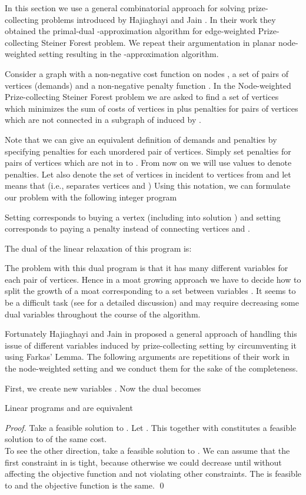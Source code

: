 In this section we use a general combinatorial approach for solving prize-collecting problems introduced by Hajiaghayi and Jain \cite{Hajiaghayi}. In their work they obtained the primal-dual -approximation algorithm for edge-weighted Prize-collecting Steiner Forest problem. We repeat their argumentation in planar node-weighted setting resulting in the -approximation algorithm. 

Consider a graph  with a non-negative cost function on nodes , a set of pairs of vertices (demands)  and a non-negative penalty function . In the Node-weighted Prize-collecting Steiner Forest problem we are asked to find a set of vertices  which minimizes the sum of costs of vertices in  plus penalties for pairs of vertices which are not connected in a subgraph of  induced by .

Note that we can give an equivalent definition of demands and penalties by specifying penalties for each unordered pair of vertices. Simply set penalties for pairs of vertices which are not in  to . From now on we will use values  to denote penalties. Let also  denote the set of vertices in  incident to vertices from  and let  means that  (i.e.,  separates vertices  and )
Using this notation, we can formulate our problem with the following integer program

Setting  corresponds to buying a vertex  (including  into solution ) and setting  corresponds to paying a penalty instead of connecting vertices  and .

The dual of the linear relaxation of this program is:

The problem with this dual program is that it has many different variables for each pair of vertices. Hence in a moat growing approach we have to decide how to split the growth of a moat corresponding to a set  between variables . It seems to be a difficult task (see \cite{Hajiaghayi} for a detailed discussion) and may require decreasing some dual variables throughout the course of the algorithm.

Fortunately Hajiaghayi and Jain in \cite{Hajiaghayi} proposed a general approach of handling this issue of different variables induced by prize-collecting setting by circumventing it using Farkas' Lemma. The following arguments are repetitions of their work in the node-weighted setting and we conduct them for the sake of the completeness.

First, we create new variables . Now the dual  becomes

\begin{fact}
Linear programs  and  are equivalent
\end{fact}
\begin{proof}
Take a feasible solution  to . Let . This together with  constitutes a feasible solution to  of the same cost.\\
To see the other direction, take a feasible solution  to . We can assume that the first constraint in  is tight, because otherwise we could decrease  until  without affecting the objective function and not violating other constraints. The  is feasible to  and the objective function is the same. \qed
\end{proof}

